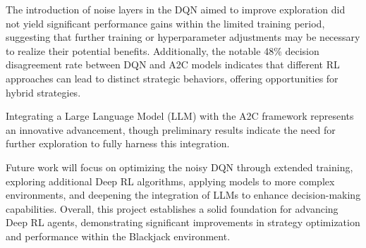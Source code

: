 \documentclass[compsoc]{IEEEtran}
\begin{document}
{{{The introduction of noise layers in the DQN aimed to improve exploration did not yield significant performance gains within the limited training period, suggesting that further training or hyperparameter adjustments may be necessary to realize their potential benefits. Additionally, the notable 48\% decision disagreement rate between DQN and A2C models indicates that different RL approaches can lead to distinct strategic behaviors, offering opportunities for hybrid strategies.

Integrating a Large Language Model (LLM) with the A2C framework represents an innovative advancement, though preliminary results indicate the need for further exploration to fully harness this integration. 

Future work will focus on optimizing the noisy DQN through extended training, exploring additional Deep RL algorithms, applying models to more complex environments, and deepening the integration of LLMs to enhance decision-making capabilities. Overall, this project establishes a solid foundation for advancing Deep RL agents, demonstrating significant improvements in strategy optimization and performance within the Blackjack environment.




%
%

\begin{thebibliography}{12}


\end{thebibliography}}}}
\end{document}
